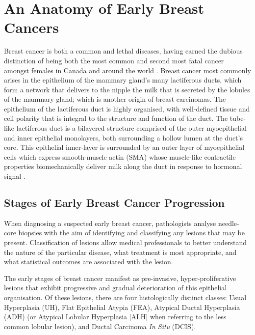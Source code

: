 \section{An Anatomy of Early Breast Cancers}
Breast cancer is both a common and lethal diseases, having earned the dubious distinction of being both the most common and second most fatal cancer amongst females in Canada and around the world \citep{ccs2015}. Breast cancer most commonly arises in the epithelium of the mammary gland's many lactiferous ducts, which form a network that delivers to the nipple the milk that is secreted by the lobules of the mammary gland; which is another origin of breast carcinomas. The epithelium of the lactiferous duct is highly organised, with well-defined tissue and cell polarity that is integral to the structure and function of the duct. The tube-like lactiferous duct is a bilayered structure comprised of the outer myoepithelial and inner epithelial monolayers, both surrounding a hollow lumen at the duct's core. This epithelial inner-layer is surrounded by an outer layer of myoepithelial cells which express smooth-muscle actin (SMA) whose muscle-like contractile properties biomechanically deliver milk along the duct in response to hormonal signal \citep{Hamperl_1970}.\par


\subsection{Stages of Early Breast Cancer Progression}
When diagnosing a suspected early breast cancer, pathologists analyse needle-core biopsies with the aim of identifying and classifying any lesions that may be present. Classification of lesions allow medical professionals to better understand the nature of the particular disease, what treatment is most appropriate, and what statistical outcomes are associated with the lesion.\par

The early stages of breast cancer manifest as pre-invasive, hyper-proliferative lesions that exhibit progressive and gradual deterioration of this epithelial organisation. Of these lesions, there are four histologically distinct classes: Usual Hyperplasia (UH), Flat Epithelial Atypia (FEA), Atypical Ductal Hyperplasia (ADH) (or Atypical Lobular Hyperplasia [ALH] when referring to the less common lobular lesion), and Ductal Carcinoma {\it In Situ} (DCIS).\par

